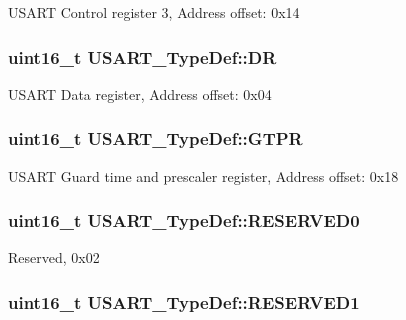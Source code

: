 U\-S\-A\-R\-T Control register 3, Address offset\-: 0x14 \hypertarget{struct_u_s_a_r_t___type_def_accee34aaec89aad4aeef512bba173ae5}{
\subsubsection[{D\-R}]{ uint16\-\_\-t U\-S\-A\-R\-T\-\_\-\-Type\-Def\-::\-D\-R}}\label{struct_u_s_a_r_t___type_def_accee34aaec89aad4aeef512bba173ae5}
U\-S\-A\-R\-T Data register, Address offset\-: 0x04 \hypertarget{struct_u_s_a_r_t___type_def_abe51502097b1fd281d0a2a1b157d769e}{
\subsubsection[{G\-T\-P\-R}]{ uint16\-\_\-t U\-S\-A\-R\-T\-\_\-\-Type\-Def\-::\-G\-T\-P\-R}}\label{struct_u_s_a_r_t___type_def_abe51502097b1fd281d0a2a1b157d769e}
U\-S\-A\-R\-T Guard time and prescaler register, Address offset\-: 0x18 \hypertarget{struct_u_s_a_r_t___type_def_a84ccd64c74c8dbc78b94172ce759de10}{
\subsubsection[{R\-E\-S\-E\-R\-V\-E\-D0}]{\setlength{\rightskip}{0pt plus 5cm}uint16\-\_\-t U\-S\-A\-R\-T\-\_\-\-Type\-Def\-::\-R\-E\-S\-E\-R\-V\-E\-D0}}\label{struct_u_s_a_r_t___type_def_a84ccd64c74c8dbc78b94172ce759de10}
Reserved, 0x02 \hypertarget{struct_u_s_a_r_t___type_def_a6d78680272a465db0ee43eba4e9c54f3}{
\subsubsection[{R\-E\-S\-E\-R\-V\-E\-D1}]{\setlength{\rightskip}{0pt plus 5cm}uint16\-\_\-t U\-S\-A\-R\-T\-\_\-\-Type\-Def\-::\-R\-E\-S\-E\-R\-V\-E\-D1}}\label{struct_u_s_a_r_t___type_def_a6d78680272a465db0ee43eba4e9c54f3}
